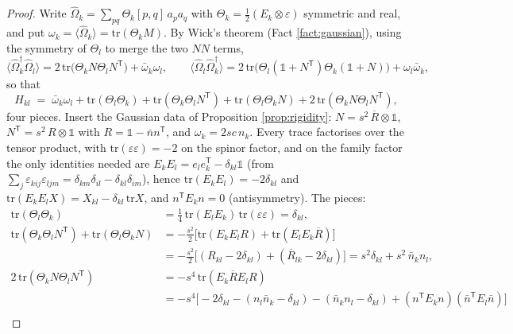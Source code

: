 \documentclass[11pt]{article}
\theoremstyle{definition}
\begin{document}
\begin{proof}
Write $\hat\Omega_{k} = \sum_{pq}\Theta_{k}[p,q]\,a_{p}a_{q}$ with $\Theta_{k} = \tfrac12(E_{k} \otimes \varepsilon)$ symmetric and real, and put $\omega_{k} = \langle\hat\Omega_{k}\rangle = \mathrm{tr}(\Theta_{k}M)$. By Wick's theorem (Fact \ref{fact:gaussian}), using the symmetry of $\Theta_{l}$ to merge the two $NN$ terms,
\[
\langle\hat\Omega_{k}^{\dagger}\hat\Omega_{l}\rangle = 2\,\mathrm{tr}\bigl(\Theta_{k}N\Theta_{l}N^{\mathsf{T}}\bigr) + \bar\omega_{k}\omega_{l}, \qquad
\langle\hat\Omega_{l}\hat\Omega_{k}^{\dagger}\rangle = 2\,\mathrm{tr}\bigl(\Theta_{l}(\mathbb{1}+N^{\mathsf{T}})\Theta_{k}(\mathbb{1}+N)\bigr) + \omega_{l}\bar\omega_{k},
\]
so that
\[
H_{kl} \;=\; \bar\omega_{k}\omega_{l} + \mathrm{tr}(\Theta_{l}\Theta_{k}) + \mathrm{tr}(\Theta_{k}\Theta_{l}N^{\mathsf{T}}) + \mathrm{tr}(\Theta_{l}\Theta_{k}N) + 2\,\mathrm{tr}(\Theta_{k}N\Theta_{l}N^{\mathsf{T}}),
\]
four pieces. Insert the Gaussian data of Proposition \ref{prop:rigidity}: $N = s^{2}\,\overline{R} \otimes \mathbb{1}$, $N^{\mathsf{T}} = s^{2}\,R \otimes \mathbb{1}$ with $R = \mathbb{1} - \bar{n}n^{\mathsf{T}}$, and $\omega_{k} = 2sc\,n_{k}$. Every trace factorises over the tensor product, with $\mathrm{tr}(\varepsilon\varepsilon) = -2$ on the spinor factor, and on the family factor the only identities needed are $E_{k}E_{l} = e_{l}e_{k}^{\mathsf{T}} - \delta_{kl}\mathbb{1}$ (from $\sum_{j}\varepsilon_{kij}\varepsilon_{ljm} = \delta_{km}\delta_{il} - \delta_{kl}\delta_{im}$), hence $\mathrm{tr}(E_{k}E_{l}) = -2\delta_{kl}$ and $\mathrm{tr}(E_{k}E_{l}X) = X_{kl} - \delta_{kl}\,\mathrm{tr}X$, and $n^{\mathsf{T}}E_{k}n = 0$ (antisymmetry). The pieces:
\begin{align*}
\mathrm{tr}(\Theta_{l}\Theta_{k}) &= \tfrac14\,\mathrm{tr}(E_{l}E_{k})\,\mathrm{tr}(\varepsilon\varepsilon) = \delta_{kl},\\
\mathrm{tr}(\Theta_{k}\Theta_{l}N^{\mathsf{T}}) + \mathrm{tr}(\Theta_{l}\Theta_{k}N) &= -\tfrac{s^{2}}{2}\bigl[\mathrm{tr}(E_{k}E_{l}R) + \mathrm{tr}(E_{l}E_{k}\overline{R})\bigr]\\
&= -\tfrac{s^{2}}{2}\bigl[(R_{kl} - 2\delta_{kl}) + (\overline{R}_{lk} - 2\delta_{kl})\bigr] = s^{2}\delta_{kl} + s^{2}\,\bar{n}_{k}n_{l},\\
2\,\mathrm{tr}(\Theta_{k}N\Theta_{l}N^{\mathsf{T}}) &= -s^{4}\,\mathrm{tr}(E_{k}\overline{R}E_{l}R)\\
&= -s^{4}\bigl[-2\delta_{kl} - (n_{l}\bar{n}_{k} - \delta_{kl}) - (\bar{n}_{k}n_{l} - \delta_{kl}) + (n^{\mathsf{T}}E_{k}n)(\bar{n}^{\mathsf{T}}E_{l}\bar{n})\bigr]\\

\end{align*}
\end{proof}
\end{document}
